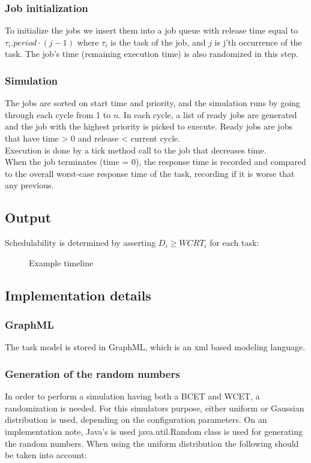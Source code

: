 \documentclass{acm_proc_article-sp}
\begin{document}
\subsubsection*{Job initialization}
To initialize the jobs we insert them into a job queue with release time equal to $\tau_{i}.period \cdot (j - 1)$ where $\tau_i$ is the task of the job, and $j$ is j'th occurrence of the task. The job's time  (remaining execution time) is also randomized in this step.
\subsubsection*{Simulation}
The jobs are sorted on start time and priority, and the simulation runs by going through each cycle from 1 to $n$. In each cycle, a list of ready jobs are generated and the job with the highest priority is picked to execute. Ready jobs are jobs that have time > 0 and release < current cycle.\\
Execution is done by a tick method call to the job that decreases time.\\
When the job terminates (time = 0), the response time is recorded and compared to the overall worst-case response time of the task, recording if it is worse that any previous.

\subsection{Output}

Schedulability is determined by asserting $D_i \geq WCRT_i$ for each task:

\begin{figure}[h]
\centering
{}
\caption{Example timeline}
\label{fig:example_timeline_output}
\end{figure}

\subsection{Implementation details}



\subsubsection{GraphML}
The task model is stored in GraphML, which is an xml based modeling language.
\subsubsection{Generation of the random numbers}
In order to perform a simulation having both a BCET and WCET, a randomization is needed. For this simulators purpose, either uniform or Gaussian distribution is used, depending on the configuration parameters. On an implementation note, Java's is used java.util.Random class is used for generating the random numbers. When using the uniform distribution the following should be taken into account:
\end{document}
